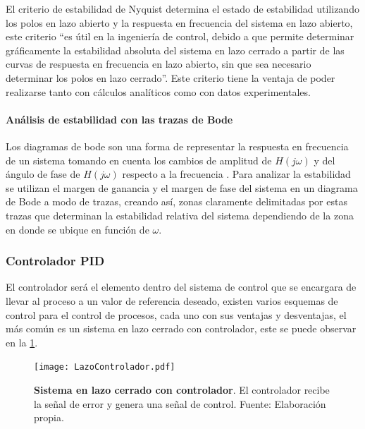 				El criterio de estabilidad de Nyquist determina el estado de estabilidad utilizando los polos en lazo abierto y la respuesta en frecuencia del sistema en lazo abierto, este criterio \enquote{es útil en la ingeniería de control, debido a que permite determinar gráficamente la estabilidad absoluta del sistema en lazo cerrado a partir de las curvas de respuesta en frecuencia en lazo abierto, sin que sea necesario determinar los polos en lazo cerrado}\Parencite[p.$\,$446]{ogata2003ingenieria}. Este criterio tiene la ventaja de poder realizarse tanto con cálculos analíticos como con datos experimentales.
			
			\paragraph{Análisis de estabilidad con las trazas de Bode}

				Los diagramas de bode son una forma de representar la respuesta en frecuencia de un sistema tomando en cuenta los cambios de amplitud de $H(j\omega)$ y del ángulo de fase de $H(j\omega)$ respecto a la frecuencia \Parencite{nilsson1995circuitos}. Para analizar la estabilidad se utilizan el margen de ganancia y el margen de fase del sistema en un diagrama de Bode a modo de trazas, creando así, zonas claramente delimitadas por estas trazas que determinan la estabilidad relativa del sistema dependiendo de la zona en donde se ubique en función de $\omega$.

		\subsubsection{Controlador PID}

			El controlador será el elemento dentro del sistema de control que se encargara de llevar al proceso a un valor de referencia deseado, existen varios esquemas de control para el control de procesos, cada uno con sus ventajas y desventajas, el más común es un sistema en lazo cerrado con controlador, este se puede observar en la \cref{fig:ControladorLazoCerrado}.

			\begin{figure}[htb]
				\centering
				\texttt{[image: LazoControlador.pdf]}
				\caption[Ejemplo de un sistema en lazo cerrado con controlador]{\textbf{Sistema en lazo cerrado con controlador}. El controlador recibe la señal de error y genera una señal de control. Fuente: Elaboración propia.} 
				\label{fig:ControladorLazoCerrado}
			\end{figure}
			
